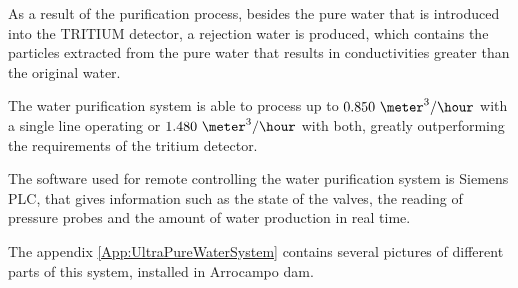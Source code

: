 As a result of the purification process, besides the pure water that is introduced into the TRITIUM detector, a rejection water is produced,  which contains the particles extracted from the pure water that results in conductivities greater than the original water.

The water purification system is able to process up to $0.850~\meter^3/\hour$ with a single line operating or $1.480~\meter^3/\hour$ with both, greatly outperforming the requirements of the tritium detector. 

The software used for remote controlling the water purification system is Siemens PLC, that gives information such as the state of the valves, the reading of pressure probes and the amount of water production in real time. 

The appendix \ref{App:UltraPureWaterSystem} contains several pictures of different parts of this system, installed in Arrocampo dam.